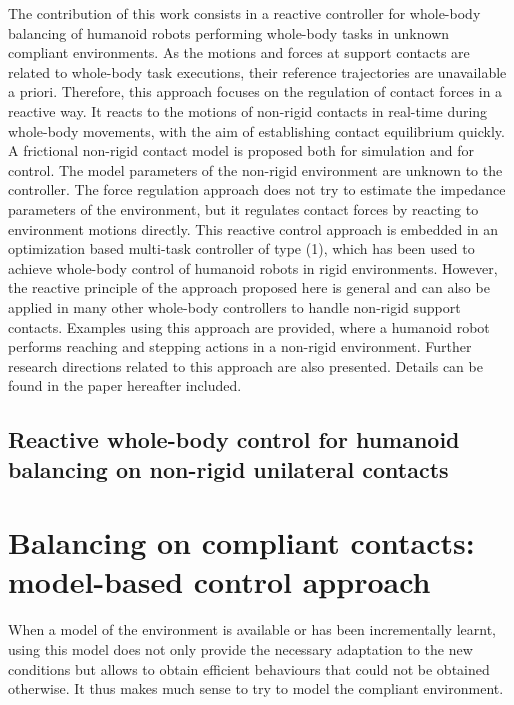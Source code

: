 \documentclass[12pt,a4paper,twoside]{article}
\begin{document}
The contribution of this work consists in a reactive controller for whole-body balancing of humanoid robots performing whole-body tasks in unknown compliant environments. As the motions and forces at support contacts are related to whole-body task executions, their reference trajectories are unavailable a priori. Therefore, this approach focuses on the regulation of contact forces in a reactive way. It reacts to the motions of non-rigid contacts in real-time during whole-body movements, with the aim of establishing contact equilibrium quickly.\\

A frictional non-rigid contact model is proposed both for simulation and for control. The model parameters of the non-rigid environment are unknown to the controller. The force regulation approach does not try to estimate the impedance parameters of the environment, but it regulates contact forces by reacting to environment motions directly. This reactive control approach is embedded in an optimization based multi-task controller of type (1), which has been used to achieve whole-body control of humanoid robots in rigid environments. However, the reactive principle of the approach proposed here is general and can also be applied in many other whole-body controllers to handle non-rigid support contacts. Examples using this approach are provided, where a humanoid robot performs reaching and stepping actions in a non-rigid environment. Further research directions related to this approach are also presented. Details can be found in the paper hereafter included.

\subsection{Reactive whole-body control for humanoid balancing on non-rigid unilateral contacts}
\label{app:liu_IROS2015}
\newpage


\section{Balancing on compliant contacts: model-based control approach}

When a model of the environment is available or has been incrementally learnt, using this model does not only provide the necessary adaptation to the new conditions but allows to obtain efficient behaviours that could not be obtained otherwise. It thus makes much sense to try to model the compliant environment.
\end{document}
